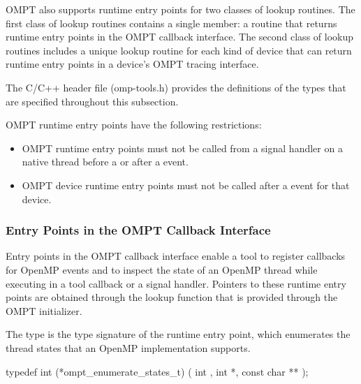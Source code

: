 OMPT also supports runtime entry points for two classes of lookup routines. The 
first class of lookup routines contains a single member: a routine that returns 
runtime entry points in the OMPT callback interface. The second class of lookup 
routines includes a unique lookup routine for each kind of device that can return 
runtime entry points in a device's OMPT tracing interface.

The C/C++ header file (omp-tools.h) provides the definitions of
the types that are specified throughout this subsection.

\restrictions

OMPT runtime entry points have the following restrictions:

\begin{itemize}
\item OMPT runtime entry points must not be called from a signal handler
      on a native thread before a  or after a 
       event.
\item OMPT device runtime entry points must not be called after a 
       event for that device.
\end{itemize}



\subsubsection{Entry Points in the OMPT Callback Interface}
\label{sec:ompt-callback-entry-points}

Entry points in the OMPT callback interface enable a tool to register callbacks 
for OpenMP events and to inspect the state of an OpenMP thread while executing 
in a tool callback or a signal handler. Pointers to these runtime entry points 
are obtained through the lookup function that is provided through the OMPT initializer.

\label{sec:ompt_enumerate_states_t}
\label{sec:ompt_enumerate_states}

\summary
The  type is the type signature of 
the  runtime entry point, which
enumerates the thread states that an OpenMP implementation supports.

\format
\begin{ccppspecific}
\begin{omptInquiry}
typedef int (*ompt_enumerate_states_t) (
  int ,
  int *,
  const char **
);
\end{omptInquiry}
\end{ccppspecific}

